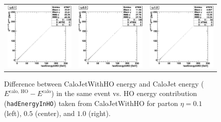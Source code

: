 \documentclass{cmspaper}
\begin{document}
\begin{figure}
 \centering
 \begin{tabular}{lll}
  \includegraphics[width=2in]{figs/h_DeltaE_EHO_corr_eta0.1.eps} &
  \includegraphics[width=2in]{figs/h_DeltaE_EHO_corr_eta0.5.eps} &
  \includegraphics[width=2in]{figs/h_DeltaE_EHO_corr_eta1.0.eps} \\
 \end{tabular}
 \caption{Difference between CaloJetWithHO energy and CaloJet energy ($E^\text{calo, HO}-E^\text{calo}$) in the same event vs. HO energy contribution (\texttt{hadEnergyInHO}) taken from CaloJetWithHO for parton $\eta=0.1$ (left), $0.5$ (center), and $1.0$ (right).}
 \label{fig:h_DeltaE_EHO}
\end{figure}
\end{document}
